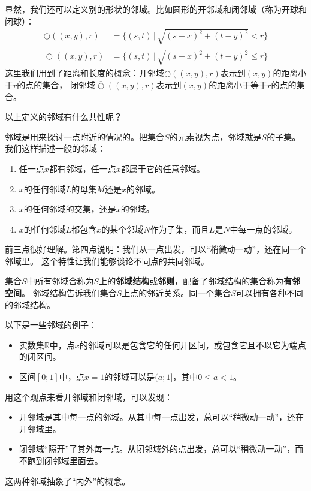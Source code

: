 \documentclass[12pt,UTF8,fontset=none]{ctexbook}
\begin{document}
显然，我们还可以定义别的形状的邻域。比如圆形的开邻域和闭邻域（称为开球和闭球）：
\begin{align*}
    \bigcirc((x,y),r) &= \{(s, t) \, | \, \sqrt{(s - x)^2 + (t - y)^2} < r\} \\
    \overline{\bigcirc}((x,y),r) &= \{(s, t) \, | \, \sqrt{(s - x)^2 + (t - y)^2} \leqslant r\}
\end{align*}
这里我们用到了距离和长度的概念：开邻域$\bigcirc((x,y),r)$表示到$(x, y)$的距离小于$r$的点的集合，
闭邻域$\overline{\bigcirc}((x,y),r)$表示到$(x, y)$的距离小于等于$r$的点的集合。

以上定义的邻域有什么共性呢？

邻域是用来探讨一点附近的情况的。把集合$S$的元素视为点，邻域就是$S$的子集。我们这样描述一般的邻域：
\begin{enumerate}
    \item 任一点$x$都有邻域，任一点$x$都属于它的任意邻域。
    \item $x$的任何邻域$L$的母集$M$还是$x$的邻域。
    \item $x$的任何邻域的交集，还是$x$的邻域。
    \item $x$的任何邻域$L$都包含$x$的某个邻域$N$作为子集，而且$L$是$N$中每一点的邻域。
\end{enumerate}
前三点很好理解。第四点说明：我们从一点出发，可以“稍微动一动”，还在同一个邻域里。
这个特性让我们能够谈论不同点的共同邻域。

集合$S$中所有邻域合称为$S$上的\textbf{邻域结构}或\textbf{邻则}，配备了邻域结构的集合称为\textbf{有邻空间}。
邻域结构告诉我们集合$S$上点的邻近关系。同一个集合$S$可以拥有各种不同的邻域结构。

以下是一些邻域的例子：
\begin{itemize}
    \item 实数集$\mathbb{R}$中，点$x$的邻域可以是包含它的任何开区间，或包含它且不以它为端点的闭区间。
    \item 区间$[0;1]$中，点$x=1$的邻域可以是$(a;1]$，其中$0\leqslant a < 1$。
\end{itemize}

用这个观点来看开邻域和闭邻域，可以发现：
\begin{itemize}
    \item 开邻域是其中每一点的邻域。从其中每一点出发，总可以“稍微动一动”，还在开邻域里。
    \item 闭邻域“隔开”了其外每一点。从闭邻域外的点出发，总可以“稍微动一动”，而不跑到闭邻域里面去。
\end{itemize}
这两种邻域抽象了“内外”的概念。
\end{document}
